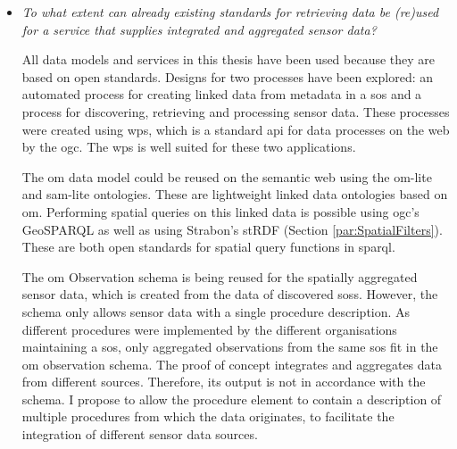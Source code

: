 \begin{itemize}
However, the down side of the detailed semantic knowledge base is that more data has to be transferred over the internet. First a \acs{sparql} query has to be made with a spatial filter, which includes verbose \ac{wkt} geometries. Then an \ac{rdf} document containing detailed information about each sensor is returned, based on which \ac{sos} requests are performed. If only the addresses of \aclp{sos} are returned, which have sensors inside a certain bounding box, both the  requests and responses are smaller. The detailed spatial query is then performed by the \aclp{sos} and does not require as much data to be transferred over the internet, which makes it a more efficient procedure. 

Still, discovering sensors is only a matter of seconds in the proof of concept. Nevertheless, automatically retrieving observation data from \aclp{sos} can take up to a couple minutes, depending on the amount of sensors for which data is requested and the temporal range. It should be noted that performance optimisation is beyond the scope of this thesis. It is likely that this can still be improved significantly in the future (see Chapter \ref{chap:futureResearch}).              


\item \textit{To what extent can already existing standards for retrieving data be (re)used for a service that supplies integrated and aggregated sensor data?}%

All data models and services in this thesis have been used because they are based on open standards. Designs for two processes have been explored: an automated process for creating linked data from metadata in a \ac{sos} and a process for discovering, retrieving and processing sensor data. These processes were created using \ac{wps}, which is a standard \ac{api} for data processes on the web by the \ac{ogc}. The \ac{wps} is well suited for these two applications.

The \ac{om} data model could be reused on the semantic web using the om-lite and sam-lite ontologies. These are lightweight linked data ontologies based on \ac{om}. Performing spatial queries on this linked data is possible using \ac{ogc}'s GeoSPARQL as well as using Strabon's stRDF (Section \ref{par:SpatialFilters}). These are both open standards for spatial query functions in \acs{sparql}.

The \ac{om} Observation schema is being reused for the spatially aggregated sensor data, which is created from the data of discovered \aclp{sos}. However, the schema only allows sensor data with a single procedure description. As different procedures were implemented by the different organisations maintaining a \ac{sos}, only aggregated observations from the same \ac{sos} fit in the \ac{om} observation schema. The proof of concept integrates and aggregates data from different sources. Therefore, its output is not in accordance with the schema. I propose to allow the procedure element to contain a description of multiple procedures from which the data originates, to facilitate the integration of different sensor data sources. 
\end{itemize}

